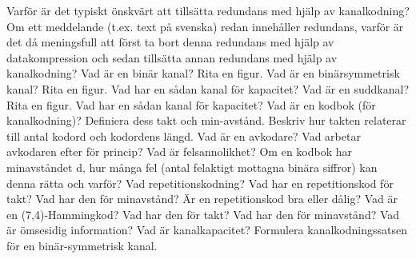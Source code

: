 \documentclass[a4paper,11pt]{article}
\begin{document}
\newline
\newline
Varför är det typiskt önskvärt att tillsätta redundans med hjälp av kanalkodning?
\newline
\newline
Om ett meddelande (t.ex. text på svenska) redan innehåller redundans, varför är det då 
meningsfull att först ta bort denna redundans med hjälp av datakompression och sedan 
tillsätta annan redundans med hjälp av kanalkodning?
\newline
\newline
Vad är en binär kanal?  Rita en figur.
\newline
\newline
Vad är en binärsymmetrisk kanal? Rita en figur. Vad har en sådan kanal för kapacitet?
\newline
\newline
Vad är en suddkanal? Rita en figur. Vad har en sådan kanal för kapacitet?
\newline
\newline
Vad är en kodbok (för kanalkodning)? Definiera dess takt och min-avstånd. Beskriv hur 
takten relaterar till antal kodord och kodordens längd.
\newline
\newline
Vad är en avkodare? Vad arbetar avkodaren efter för princip?
\newline
\newline
Vad är felsannolikhet?
\newline
\newline
Om en kodbok har minavståndet d, hur många fel (antal felaktigt mottagna binära siffror) 
kan denna rätta och varför?
\newline
\newline
Vad repetitionskodning? Vad har en repetitionskod för takt?  Vad har den för minavstånd? Är
en repetitionskod bra eller dålig?
\newline
\newline
Vad är en (7,4)-Hammingkod? Vad har den för takt? Vad har den för minavstånd?  
\newline
\newline
Vad är ömsesidig information? 
\newline
\newline
Vad är kanalkapacitet?
\newline
\newline
Formulera 
kanalkodningssatsen
för en binär-symmetrisk kanal.
\newline
\newline
\end{document}
